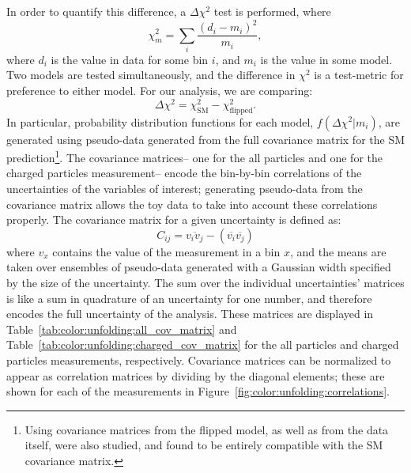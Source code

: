 	In order to quantify this difference, a $\Delta \chi^2$ test is performed, where
	\begin{equation}
	\chi^2_m = \sum_i \frac{(d_i-m_i)^2}{m_i},
	\end{equation}
	where $d_i$ is the value in data for some bin $i$, and $m_i$ is the value in some model. Two models are tested simultaneously, and the difference in $\chi^2$ is a test-metric for preference to either model. For our analysis, we are comparing:
	\begin{equation}
	\Delta \chi^2 = \chi^2_\mathrm{SM} - \chi^2_\mathrm{flipped}.
	\end{equation} 
	In particular, probability distribution functions for each model, $f(\Delta \chi^2 | m_i)$, are generated using pseudo-data generated from the full covariance matrix for the SM prediction\footnote{Using covariance matrices from the flipped model, as well as from the data itself, were also studied, and found to be entirely compatible with the SM covariance matrix.}. The covariance matrices-- one for the all particles and one for the charged particles measurement-- encode the bin-by-bin correlations of the uncertainties of the variables of interest; generating pseudo-data from the covariance matrix allows the toy data to take into account these correlations properly. The covariance matrix for a given uncertainty is defined as:
	\begin{equation}
	C_{ij} = \overline{v_i v_j} - (\overline{v_i} \overline{v_j})
	\end{equation}
	where $v_x$ contains the value of the measurement in a bin $x$, and the means are taken over ensembles of pseudo-data generated with a Gaussian width specified by the size of the uncertainty. The sum over the individual uncertainties' matrices is like a sum in quadrature of an uncertainty for one number, and therefore encodes the full uncertainty of the analysis. These matrices are displayed in Table~\ref{tab:color:unfolding:all_cov_matrix} and Table~\ref{tab:color:unfolding:charged_cov_matrix} for the all particles and charged particles measurements, respectively. Covariance matrices can be normalized to appear as correlation matrices by dividing by the diagonal elements; these are shown for each of the measurements in Figure~\ref{fig:color:unfolding:correlations}.




